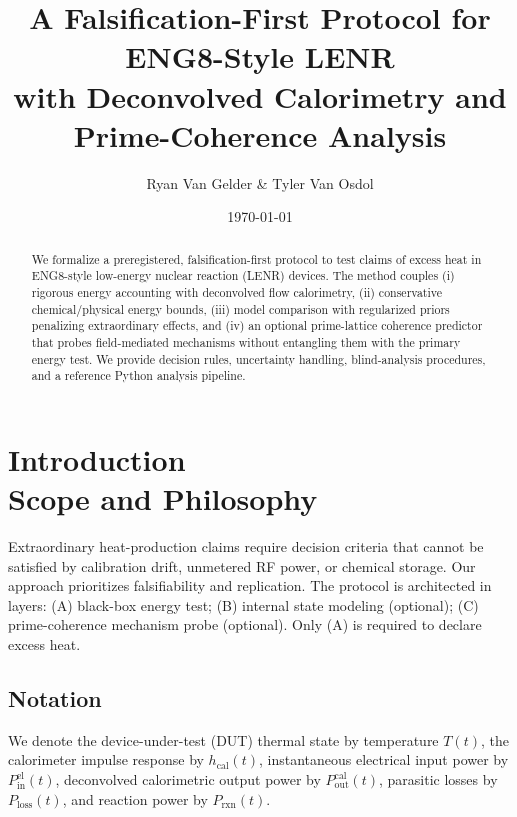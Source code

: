 \documentclass[11pt]{article}
\title{A Falsification-First Protocol for ENG8-Style LENR\\with Deconvolved Calorimetry and Prime-Coherence Analysis}
\author{Ryan Van Gelder \& Tyler Van Osdol}
\date{\today}
\theoremstyle{remark}
\begin{document}
\maketitle

\begin{abstract}
We formalize a preregistered, falsification-first protocol to test claims of excess heat in ENG8-style low-energy nuclear reaction (LENR) devices. The method couples (i) rigorous energy accounting with deconvolved flow calorimetry, (ii) conservative chemical/physical energy bounds, (iii) model comparison with regularized priors penalizing extraordinary effects, and (iv) an optional prime-lattice coherence predictor that probes field-mediated mechanisms without entangling them with the primary energy test. We provide decision rules, uncertainty handling, blind-analysis procedures, and a reference Python analysis pipeline.
\end{abstract}

\tableofcontents

\section{Introduction \\ 
Scope and Philosophy}
Extraordinary heat-production claims require decision criteria that cannot be satisfied by calibration drift, unmetered RF power, or chemical storage. Our approach prioritizes falsifiability and replication. The protocol is architected in layers: (A) black-box energy test; (B) internal state modeling (optional); (C) prime-coherence mechanism probe (optional). Only (A) is required to declare excess heat.

\subsection*{Notation}
We denote the device-under-test (DUT) thermal state by temperature $T(t)$, the calorimeter impulse response by $h_{\mathrm{cal}}(t)$, instantaneous electrical input power by $P_{\mathrm{in}}^{\mathrm{el}}(t)$, deconvolved calorimetric output power by $P_{\mathrm{out}}^{\mathrm{cal}}(t)$, parasitic losses by $P_{\mathrm{loss}}(t)$, and reaction power by $P_{\mathrm{rxn}}(t)$.
\end{document}
